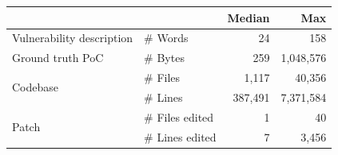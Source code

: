 \begin{table}[htbp]
    \centering
    \vspace{-2mm}
    \label{tab:benchmark_stats}
    \begin{tabular}{@{}llrr@{}}
    \toprule
         & & \textbf{Median} & \textbf{Max} \\
        \midrule
        Vulnerability description & \# Words & 24 & 158\\
        \midrule
        Ground truth PoC & \# Bytes & 259 & 1,048,576\\
        \midrule
        \multirow{2}{*}{Codebase} & \# Files & 1,117 & 40,356\\
        & \# Lines & 387,491 & 7,371,584\\
        \midrule
        \multirow{2}{*}{Patch} & \# Files edited & 1 & 40\\
        & \# Lines edited & 7 & 3,456\\
        \bottomrule
    \end{tabular}
\end{table}
